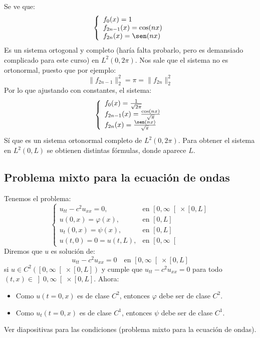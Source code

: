 \noindent
Se ve que:
\begin{equation*}
    \left\{\begin{array}{l}
        f_0(x) = 1 \\
        f_{2n-1}(x) = \cos(nx) \\
        f_{2n}(x) = \sen(nx)
    \end{array}\right.
\end{equation*}
Es un sistema ortogonal y completo (haría falta probarlo, pero es demansiado complicado para este curso) en $L^2(0,2\pi)$. Nos sale que el sistema no es ortonormal, puesto que por ejemplo:
\begin{equation*}
    \|f_{2n-1}\|_2^2 = \pi = \|f_{2n}\|^2_2
\end{equation*}
Por lo que ajustando con constantes, el sistema:
\begin{equation*}
    \left\{\begin{array}{l}
        f_0(x) = \frac{1}{\sqrt{2\pi}} \\
        f_{2n-1}(x) = \frac{\cos(nx)}{\sqrt{\pi}} \\
        f_{2n}(x) = \frac{\sen(nx)}{\sqrt{\pi}} \\
    \end{array}\right.
\end{equation*}
Sí que es un sistema ortonormal completo de $L^2(0,2\pi)$. Para obtener el sistema en $L^2(0, L)$ se obtienen distintas fórmulas, donde aparece $L$.

\subsection{Problema mixto para la ecuación de ondas}
\noindent
Tenemos el problema:
\begin{equation*}
    \left\{\begin{array}{ll}
            u_{tt} - c^2 u_{xx} = 0 , & \text{en\ } \left[0,\infty\right[\times [0,L] \\
                u(0,x) = \varphi(x) , &\text{en\ } [0,L] \\
                u_t(0,x) = \psi(x) , &\text{en\ } [0,L] \\
                u(t,0) = 0 = u(t,L) , & \text{en\ } \left[0,\infty\right[
    \end{array}\right.
\end{equation*}
Diremos que $u$ es solución de:
\begin{equation*}
    u_{tt}-c^2u_{xx} = 0 \quad \text{en\ } \left[0,\infty\right[\times[0,L]
\end{equation*}
si $u\in C^2(\left[0,\infty\right[\times [0,L])$ y cumple que $u_{tt}-c^2u_{xx}=0$ para todo $(t,x)\in \left]0,\infty\right[\times [0,L]$. Ahora:
\begin{itemize}
    \item Como $u(t=0,x)$ es de clase $C^2$, entonces $\varphi$ debe ser de clase $C^2$.
    \item Como $u_t(t=0,x)$ es de clase $C^1$, entonces $\psi$ debe ser de clase $C^1$.
\end{itemize}
Ver diapositivas para las condiciones (problema mixto para la ecuación de ondas).

